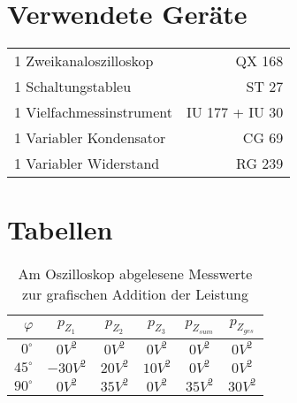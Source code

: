 
\section{Verwendete Geräte}

\begin{table}[H]
\begin{center}
\begin{Large}
\begin{tabular}{| l | r |}
\hline
1 Zweikanaloszilloskop & QX 168\\
1 Schaltungstableu & ST 27\\
1 Vielfachmessinstrument & IU 177 + IU 30\\
1 Variabler Kondensator & CG 69\\
1 Variabler Widerstand & RG 239
\end{tabular}
\end{Large}
\end{center}
\end{table}

\section{Tabellen}

\begin{table}[H]
\caption{Am Oszilloskop abgelesene Messwerte zur grafischen Addition der Leistung}
\label{tab:Momentanleistungswerte}
\begin{center}
\begin{Large}
\begin{tabular}{| r | c | c | c | c | c|}
\hline
\rowcolor{blue}\color{white} $\varphi$ & \color{white}$p_{Z_1}$ & \color{white}$p_{Z_2}$ & \color{white}$p_{Z_3}$  & \color{white}$p_{Z_{sum}}$ & \color{white}$p_{Z_{ges}}$ \\
\hline 
$0^\circ$ & $0V^2$ & $0V^2$ & $0V^2$ & $0V^2$ & $0V^2$ \\
$45^\circ$ & $-30V^2$ & $20V^2$ & $10V^2$ & $0V^2$ & $0V^2$\\
$90^\circ$ & $0V^2$ & $35V^2$ & $0V^2$ & $35V^2$ & $30V^2$ \\
\hline
\end{tabular}
\end{Large}
\end{center}
\end{table}


